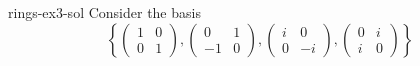 \documentclass[preview]{standalone}
\begin{document}
\begin{snippetsolution}{rings-ex3-sol}{}
    Consider the basis
    \[
        \left\{
            \begin{pmatrix} 1 & 0 \\ 0 & 1 \end{pmatrix},
            \begin{pmatrix} 0 & 1 \\ -1 & 0 \end{pmatrix},
            \begin{pmatrix} i & 0 \\ 0 & -i \end{pmatrix},
            \begin{pmatrix} 0 & i \\ i & 0 \end{pmatrix}
        \right\}
    \]
\end{snippetsolution}
\end{document}
